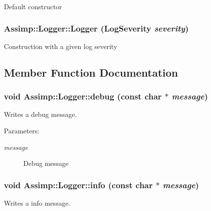 Default constructor \hypertarget{class_assimp_1_1_logger_ccc0ffea63ddf0982d8c2ba7e07f0716}{
\subsubsection[Logger]{\setlength{\rightskip}{0pt plus 5cm}Assimp::Logger::Logger ({\bf LogSeverity} {\em severity})}}
\label{class_assimp_1_1_logger_ccc0ffea63ddf0982d8c2ba7e07f0716}


Construction with a given log severity 

\subsection{Member Function Documentation}
\hypertarget{class_assimp_1_1_logger_3b10454ab4c0949f251062376d9c4161}{
\subsubsection[debug]{\setlength{\rightskip}{0pt plus 5cm}void Assimp::Logger::debug (const char $\ast$ {\em message})}}
\label{class_assimp_1_1_logger_3b10454ab4c0949f251062376d9c4161}


Writes a debug message. 

\begin{Desc}
\item[Parameters:]
\begin{description}
\item[{\em message}]Debug message \end{description}
\end{Desc}
\hypertarget{class_assimp_1_1_logger_12b8a125083c47ac0bb6056f00761e52}{
\subsubsection[info]{\setlength{\rightskip}{0pt plus 5cm}void Assimp::Logger::info (const char $\ast$ {\em message})}}
\label{class_assimp_1_1_logger_12b8a125083c47ac0bb6056f00761e52}


Writes a info message. 

